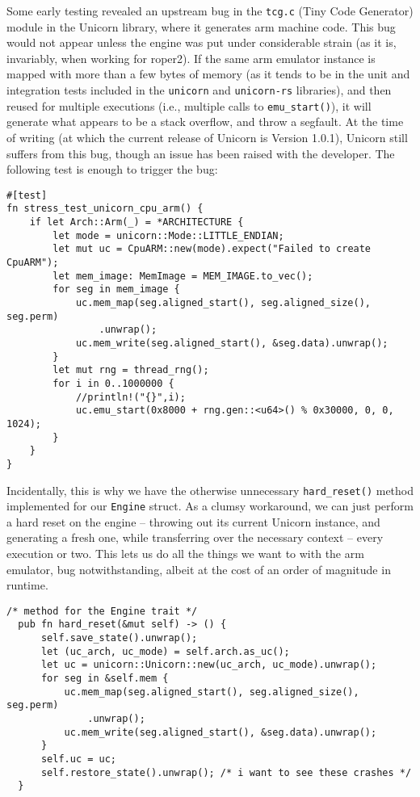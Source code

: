 \documentclass[11pt]{article}
\begin{document}
Some early testing revealed an upstream bug in the \texttt{tcg.c} (Tiny
Code Generator) module in the Unicorn library, where it generates
\gls{arm} machine code. This bug would not appear unless the engine
was put under considerable strain (as it is, invariably, when working
for \gls{roper2}). If the same \gls{arm} emulator instance is mapped with more
than a few bytes of memory (as it tends to be in the unit and integration
tests included in the \texttt{unicorn} and \texttt{unicorn-rs} libraries), and then
reused for multiple executions (i.e., multiple calls to \texttt{emu\_start()}),
it will generate what appears to be a stack overflow, and throw a
segfault. At the time of writing (at which the current release of
Unicorn is Version 1.0.1), Unicorn still suffers from this bug, though
an issue has been raised with the developer. The following test is
enough to trigger the bug:  

\lstset{language=rust,label=org3580dee,caption= ,captionpos=b,numbers=none}
\begin{lstlisting}
#[test]
fn stress_test_unicorn_cpu_arm() {
    if let Arch::Arm(_) = *ARCHITECTURE {
        let mode = unicorn::Mode::LITTLE_ENDIAN;
        let mut uc = CpuARM::new(mode).expect("Failed to create CpuARM");
        let mem_image: MemImage = MEM_IMAGE.to_vec();
        for seg in mem_image {
            uc.mem_map(seg.aligned_start(), seg.aligned_size(), seg.perm)
                .unwrap();
            uc.mem_write(seg.aligned_start(), &seg.data).unwrap();
        }
        let mut rng = thread_rng();
        for i in 0..1000000 {
            //println!("{}",i);
            uc.emu_start(0x8000 + rng.gen::<u64>() % 0x30000, 0, 0, 1024);
        }
    }
}
\end{lstlisting}

Incidentally, this is why we have the otherwise unnecessary \texttt{hard\_reset()}
method implemented for our \texttt{Engine} struct. As a clumsy workaround, we can
just perform a hard reset on the engine -- throwing out its current Unicorn
instance, and generating a fresh one, while transferring over the necessary
context -- every execution or two. This lets us do all the things we want to
with the \gls{arm} emulator, bug notwithstanding, albeit at the cost of an
order of magnitude in runtime. 

\lstset{language=rust,label=org0575b77,caption= ,captionpos=b,numbers=none}
\begin{lstlisting}
/* method for the Engine trait */
  pub fn hard_reset(&mut self) -> () {
      self.save_state().unwrap();
      let (uc_arch, uc_mode) = self.arch.as_uc();
      let uc = unicorn::Unicorn::new(uc_arch, uc_mode).unwrap();
      for seg in &self.mem {
          uc.mem_map(seg.aligned_start(), seg.aligned_size(), seg.perm)
              .unwrap();
          uc.mem_write(seg.aligned_start(), &seg.data).unwrap();
      }
      self.uc = uc;
      self.restore_state().unwrap(); /* i want to see these crashes */
  }
\end{lstlisting}
\end{document}
